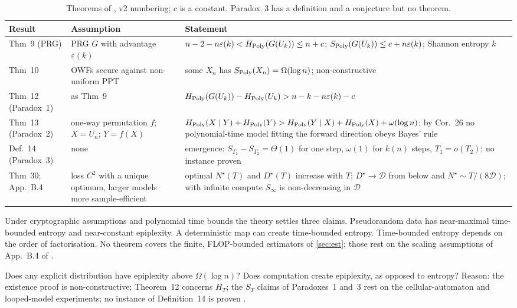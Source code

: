 \documentclass[11pt]{article}
\newcommand{\Dt}{\mathcal{D}}\newcommand{\PT}{\mathcal{P}_T}\newcommand{\prog}{\mathrm{P}}
\theoremstyle{tight}
\begin{document}
\begin{table}[!htb]
\centering\small
\caption{Theorems of \citet{finzi2026epiplexity}, v2 numbering; $c$ is a constant. Paradox~3 has a
definition and a conjecture but no theorem.}\label{tab:thm}
\begin{tabularx}{\textwidth}{@{}P{2.3cm}P{3.6cm}L@{}}
\toprule
Result & Assumption & Statement \\
\midrule
Thm~9 (PRG) & PRG $G$ with advantage $\varepsilon(k)$ &
$n-2-n\varepsilon(k)<H_{\mathrm{Poly}}(G(U_k))\le n+c$; $S_{\mathrm{Poly}}(G(U_k))\le c+n\varepsilon(k)$; Shannon entropy $k$ \\
Thm~10 & OWFs secure against non-uniform PPT & some $X_n$ has $S_{\mathrm{Poly}}(X_n)=\Omega(\log n)$; non-constructive \\
Thm~12 (Paradox~1) & as Thm~9 & $H_{\mathrm{Poly}}(G(U_k))-H_{\mathrm{Poly}}(U_k)>n-k-n\varepsilon(k)-c$ \\
Thm~13 (Paradox~2) & one-way permutation $f$; $X=U_n$; $Y=f(X)$ & $H_{\mathrm{Poly}}(X\mid Y)+H_{\mathrm{Poly}}(Y)>H_{\mathrm{Poly}}(Y\mid X)+H_{\mathrm{Poly}}(X)+\omega(\log n)$; by Cor.~26 no polynomial-time model fitting the forward direction obeys Bayes' rule \\
Def.~14 (Paradox~3) & none & emergence: $S_{T_1}-S_{T_2}=\Theta(1)$ for one step, $\omega(1)$ for $k(n)$ steps, $T_1=o(T_2)$; no instance proven \\
Thm~30; App.~B.4 & loss $C^2$ with a unique optimum, larger models more sample-efficient & optimal $N^\star(T)$ and $D^\star(T)$ increase with $T$; $D^\star\to\Dt$ from below and $N^\star\sim T/(8\Dt)$; with infinite compute $S_\infty$ is non-decreasing in $\Dt$ \\
\bottomrule
\end{tabularx}
\end{table}

\begin{stated}
Under cryptographic assumptions and polynomial time bounds the theory settles three claims.
Pseudorandom data has near-maximal time-bounded entropy and near-constant epiplexity. A deterministic
map can create time-bounded entropy. Time-bounded entropy depends on the order of factorisation. No
theorem covers the finite, FLOP-bounded estimators of \cref{sec:est}; those rest on the scaling
assumptions of App.~B.4 of \citet{finzi2026epiplexity}.
\end{stated}

\begin{unsettled}
Does any explicit distribution have epiplexity above $\Omega(\log n)$? Does computation create
epiplexity, as opposed to entropy? Reason: the existence proof is non-constructive; Theorem~12
concerns $H_T$; the $S_T$ claims of Paradoxes~1 and~3 rest on the cellular-automaton and looped-model
experiments; no instance of Definition~14 is proven \citep{finzi2026epiplexity}.
\end{unsettled}
\end{document}
